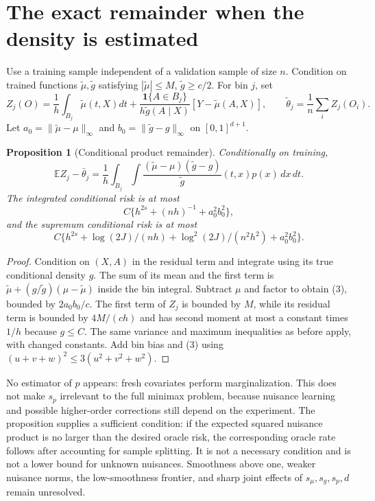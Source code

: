 \documentclass[11pt,a4paper]{article}
\newtheorem{proposition}[theorem]{Proposition}
\theoremstyle{remark}
\newcommand{\E}{\mathbb E}
\newcommand{\ind}{\mathbf 1}
\begin{document}
\section{The exact remainder when the density is estimated}
Use a training sample independent of a validation sample of size $n$. Condition on trained functions $\widetilde\mu,\widetilde g$ satisfying $|\widetilde\mu|\le M$, $\widetilde g\ge c/2$. For bin $j$, set
\[
 Z_j(O)=\frac1h\int_{B_j}\widetilde\mu(t,X)dt+
 \frac{\ind\{A\in B_j\}}{h\widetilde g(A\mid X)}
 [Y-\widetilde\mu(A,X)],\qquad
 \widetilde\theta_j=\frac1n\sum_i Z_j(O_i).
\]
Let $a_0=\|\widetilde\mu-\mu\|_\infty$ and $b_0=\|\widetilde g-g\|_\infty$ on $[0,1]^{d+1}$.

\begin{proposition}[Conditional product remainder]
Conditionally on training,
\[
 \E Z_j-\bar\theta_j
 =\frac1h\int_{B_j}\int
 \frac{(\widetilde\mu-\mu)(\widetilde g-g)}{\widetilde g}(t,x)
 p(x)\,dx\,dt. \tag{3}
\]
The integrated conditional risk is at most
\[
 C\{h^{2s}+(nh)^{-1}+a_0^2b_0^2\},
\]
and the supremum conditional risk is at most
\[
 C\{h^{2s}+\log(2J)/(nh)+\log^2(2J)/(n^2h^2)+a_0^2b_0^2\}.
\]
\end{proposition}
\begin{proof}
Condition on $(X,A)$ in the residual term and integrate using its true conditional density $g$. The sum of its mean and the first term is $\widetilde\mu+(g/\widetilde g)(\mu-\widetilde\mu)$ inside the bin integral. Subtract $\mu$ and factor to obtain (3), bounded by $2a_0b_0/c$. The first term of $Z_j$ is bounded by $M$, while its residual term is bounded by $4M/(ch)$ and has second moment at most a constant times $1/h$ because $g\le C$. The same variance and maximum inequalities as before apply, with changed constants. Add bin bias and (3) using $(u+v+w)^2\le3(u^2+v^2+w^2)$.
\end{proof}

No estimator of $p$ appears: fresh covariates perform marginalization. This does not make $s_p$ irrelevant to the full minimax problem, because nuisance learning and possible higher-order corrections still depend on the experiment. The proposition supplies a sufficient condition: if the expected squared nuisance product is no larger than the desired oracle risk, the corresponding oracle rate follows after accounting for sample splitting. It is not a necessary condition and is not a lower bound for unknown nuisances. Smoothness above one, weaker nuisance norms, the low-smoothness frontier, and sharp joint effects of $s_\mu,s_g,s_p,d$ remain unresolved.
\end{document}
